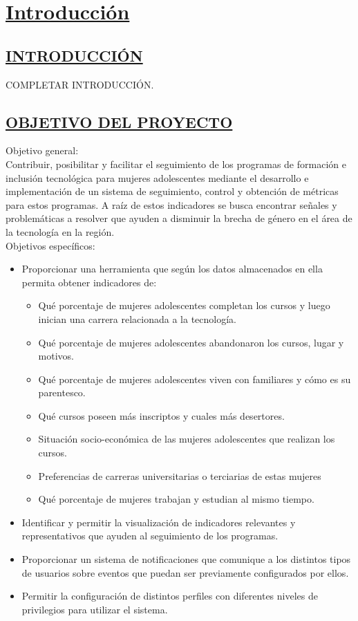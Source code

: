 \newpage

\chapter{\centering \underline{Introducción}}

\section{\underline{INTRODUCCIÓN}}
COMPLETAR INTRODUCCIÓN.\\

\section{\underline{OBJETIVO DEL PROYECTO}}

Objetivo general:\\

Contribuir, posibilitar y facilitar el seguimiento de los programas de formación e inclusión tecnológica para mujeres adolescentes mediante el desarrollo e implementación de un sistema de seguimiento, control y obtención de métricas para estos programas.
A raíz de estos indicadores se busca encontrar señales y problemáticas a resolver que ayuden a disminuir la brecha de género en el área de la tecnología en la región.\\

Objetivos específicos:
\begin{itemize}
	\item Proporcionar una herramienta que según los datos almacenados en ella permita obtener indicadores de:
	\begin{itemize}
	\item Qué porcentaje de mujeres adolescentes completan los cursos y luego inician una carrera relacionada a la tecnología.
	\item Qué porcentaje de mujeres adolescentes abandonaron los cursos, lugar y motivos.
	\item Qué porcentaje de mujeres adolescentes viven con familiares y cómo es su parentesco.
	\item Qué cursos poseen más inscriptos y cuales más desertores.
	\item Situación socio-económica de las mujeres adolescentes que realizan los cursos.
	\item Preferencias de carreras universitarias o terciarias de estas mujeres
	\item Qué porcentaje de mujeres trabajan y estudian al mismo tiempo.
	\end{itemize}
	\item Identificar y permitir la visualización de indicadores relevantes y representativos que ayuden al seguimiento de los programas.
	\item Proporcionar un sistema de notificaciones que comunique a los distintos tipos de usuarios sobre eventos que puedan ser previamente configurados por ellos.
	\item Permitir la configuración de distintos perfiles con diferentes niveles de privilegios para utilizar el sistema.\\
\end{itemize}

